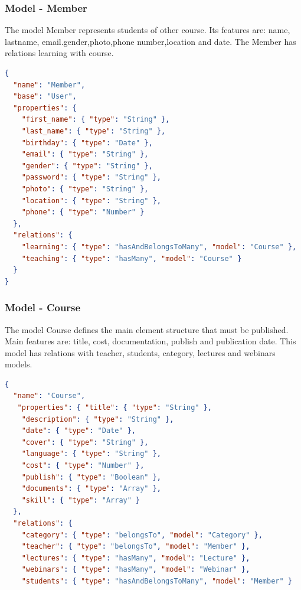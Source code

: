 \subsubsection{ Model - Member}

The model Member represents students of other course. Its features are: name, lastname, email.gender,photo,phone number,location and date. The Member has relations learning with course.

\begin{lstlisting}[language=json]
{
  "name": "Member",
  "base": "User",
  "properties": {
    "first_name": { "type": "String" },
    "last_name": { "type": "String" },   
    "birthday": { "type": "Date" },
    "email": { "type": "String" },
    "gender": { "type": "String" },
    "password": { "type": "String" },
    "photo": { "type": "String" },
    "location": { "type": "String" },
    "phone": { "type": "Number" }
  },
  "relations": {
    "learning": { "type": "hasAndBelongsToMany", "model": "Course" },
    "teaching": { "type": "hasMany", "model": "Course" }
  }
}
\end{lstlisting}


\subsubsection{ Model - Course}

The model Course defines the main element structure that must be published. Main features are: title, cost, documentation, publish and publication date. This model has relations with teacher, students, category, lectures and webinars models.


\begin{lstlisting}[language=json]
{
  "name": "Course",
   "properties": { "title": { "type": "String" },
    "description": { "type": "String" },
    "date": { "type": "Date" },
    "cover": { "type": "String" },
    "language": { "type": "String" },
    "cost": { "type": "Number" },
    "publish": { "type": "Boolean" },
    "documents": { "type": "Array" },
    "skill": { "type": "Array" }
  },
  "relations": {
    "category": { "type": "belongsTo", "model": "Category" },
    "teacher": { "type": "belongsTo", "model": "Member" },
    "lectures": { "type": "hasMany", "model": "Lecture" },
    "webinars": { "type": "hasMany", "model": "Webinar" },
    "students": { "type": "hasAndBelongsToMany", "model": "Member" }

\end{lstlisting}

